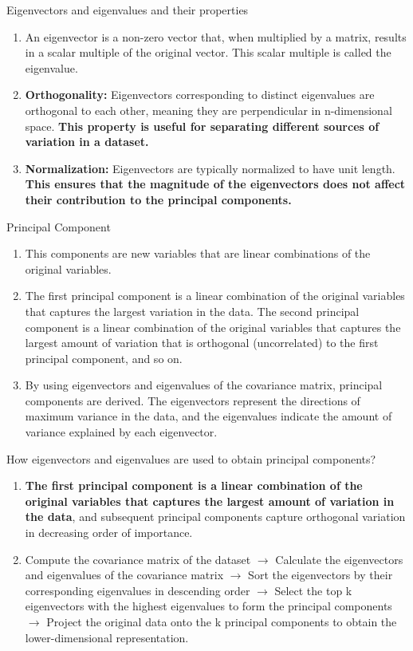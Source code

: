 \documentclass{beamer}
\begin{document}
\begin{frame}{Eigenvectors and eigenvalues and their properties }
    \begin{enumerate}
        \item An eigenvector is a non-zero vector that, when multiplied by a matrix, results in a scalar multiple of the original vector. This scalar multiple is called the eigenvalue.
        \item \textbf{Orthogonality:} Eigenvectors corresponding to distinct eigenvalues are orthogonal to each other, meaning they are perpendicular in n-dimensional space. \textbf{This property is useful for separating different sources of variation in a dataset.}
        \item \textbf{Normalization:} Eigenvectors are typically normalized to have unit length. \textbf{This ensures that the magnitude of the eigenvectors does not affect their contribution to the principal components.}
    \end{enumerate}
\end{frame}

\begin{frame}{Principal Component}
    \begin{enumerate}
        \item This components are new variables that are linear combinations of the original variables.
        \item The first principal component is a linear combination of the original variables that captures the largest variation in the data. The second principal component is a linear combination of the original variables that captures the largest amount of variation that is orthogonal (uncorrelated) to the first principal component, and so on.
        \item By using eigenvectors and eigenvalues of the covariance matrix, principal components are derived. The eigenvectors represent the directions of maximum variance in the data, and the eigenvalues indicate the amount of variance explained by each eigenvector. \
    \end{enumerate}
\end{frame}

\begin{frame}{How eigenvectors and eigenvalues are used to obtain principal components?}
    \begin{enumerate}
        \item \textbf{The first principal component is a linear combination of the original variables that captures the largest amount of variation in the data}, and subsequent principal components capture orthogonal variation in decreasing order of importance.
        \item Compute the covariance matrix of the dataset $\rightarrow$ Calculate the eigenvectors and eigenvalues of the covariance matrix $\rightarrow$ Sort the eigenvectors by their corresponding eigenvalues in descending order $\rightarrow$ Select the top k eigenvectors with the highest eigenvalues to form the principal components $\rightarrow$ Project the original data onto the k principal components to obtain the lower-dimensional representation.
    \end{enumerate}
\end{frame}
\end{document}
